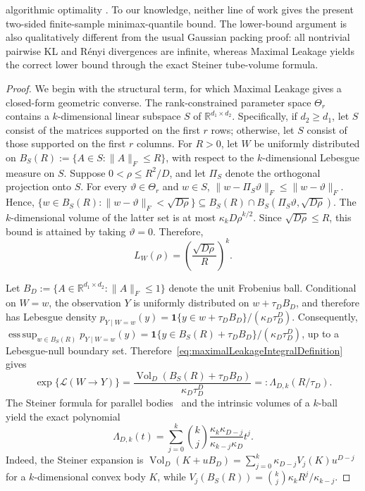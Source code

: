 \documentclass[11pt]{article}
\theoremstyle{definition}
\theoremstyle{remark}
\newcommand{\1}{\boldsymbol{1}}
\newcommand{\ml}[2]{\mathcal{L}(#1\!\to\!#2)}
\begin{document}
algorithmic optimality \cite{DudejaLiuMa2026}. To our knowledge, neither
line of work gives the present two-sided finite-sample minimax-quantile
bound. The lower-bound argument is also qualitatively different from the
usual Gaussian packing proof: all nontrivial pairwise KL and R\'enyi
divergences are infinite, whereas  Maximal Leakage yields the correct lower bound through the exact Steiner
tube-volume formula.
\begin{proof}
We begin with the structural term, for which Maximal Leakage gives a
closed-form geometric converse. The rank-constrained parameter space \(\Theta_r\) contains a
\(k\)-dimensional linear subspace \(S\) of
\(\mathbb R^{d_1\times d_2}\). Specifically, if \(d_2\ge d_1\), let \(S\) consist of the matrices
supported on the first \(r\) rows; otherwise, let \(S\) consist of those
supported on the first \(r\) columns. For \(R>0\), let \(W\) be uniformly
distributed on \(B_S(R):=\{A\in S:\|A\|_F\leq R\}\),
with respect to the \(k\)-dimensional Lebesgue measure on \(S\).
Suppose $0<\rho\leq R^2/D$, and let \(\Pi_S\) denote the orthogonal projection onto \(S\).
For every \(\vartheta\in\Theta_r\) and \(w\in S\),
\(\|w-\Pi_S\vartheta\|_F\le \|w-\vartheta\|_F\).
Hence,
\(\{w\in B_S(R):\|w-\vartheta\|_F<\sqrt{D\rho}\}
\subseteq B_S(R)\cap B_S(\Pi_S\vartheta,\sqrt{D\rho})\).
The \(k\)-dimensional volume of the latter set is at most
\(\kappa_k {D\rho}^{k/2}\). Since \(\sqrt{D\rho}\le R\), this bound is attained by taking
\(\vartheta=0\). Therefore,
\begin{equation}
    L_W(\rho)
=
\left(\frac{\sqrt{D\rho}}{R}\right)^k.
    \label{eq:lowRankPriorSmallBall}
\end{equation}


Let
\( 
B_D:=\{A\in\mathbb R^{d_1\times d_2}:\|A\|_F\le1\}
\)
denote the unit Frobenius ball. Conditional on \(W=w\), the observation
\(Y\) is uniformly distributed on \(w+\tau_D B_D\), and therefore has
Lebesgue density
\(p_{Y\mid W=w}(y)=\mathbf 1\{y\in w+\tau_D B_D\}/
(\kappa_D\tau_D^D)\). Consequently,
\(\operatorname*{ess\,sup}_{w\in B_S(R)}p_{Y\mid W=w}(y)
=\mathbf 1\{y\in B_S(R)+\tau_D B_D\}/
(\kappa_D\tau_D^D)\),
up to a Lebesgue-null boundary set. Therefore~\eqref{eq:maximalLeakageIntegralDefinition} gives
\begin{equation}
\exp\{\ml{W}{Y}\}
=
\frac{
\operatorname{Vol}_D(B_S(R)+\tau_DB_D)
}{
\kappa_D\tau_D^D
}
=:
\Lambda_{D,k}(R/\tau_D).
\label{eq:lowRankLeakageTubeRatio}
\end{equation}
The Steiner formula for parallel bodies~\cite{Schneider2014} and the
intrinsic volumes of a $k$-ball yield the exact polynomial
\begin{equation}
\Lambda_{D,k}(t)
=
\sum_{j=0}^{k}
\binom{k}{j}
\frac{\kappa_k\kappa_{D-j}}
     {\kappa_{k-j}\kappa_D}
t^j.
\label{eq:lowRankSteinerPolynomial}
\end{equation}
Indeed, the Steiner expansion is
\(\operatorname{Vol}_D(K+uB_D)=
\sum_{j=0}^k\kappa_{D-j}V_j(K)u^{D-j}\)
for a $k$-dimensional convex body $K$, while
\(V_j(B_S(R))=\binom{k}{j}\kappa_kR^j/\kappa_{k-j}\).


\end{proof}
\end{document}

